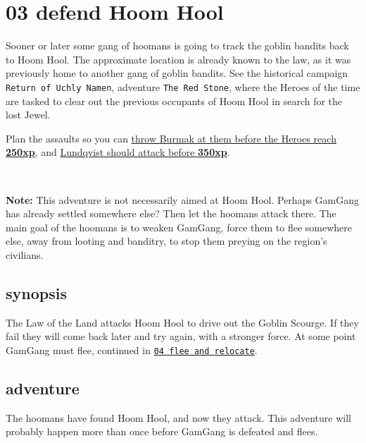 \clearpage
\section*{03 defend Hoom Hool}
\label{03defendhoomhool}

Sooner or later some gang of hoomans is going to track the goblin bandits back to Hoom Hool. The approximate location is already known to the law, as it was previously home to another gang of goblin bandits. See the historical campaign \texttt{Return of Uchly Namen}, adventure \texttt{The Red Stone}, where the Heroes of the time are tasked to clear out the previous occupants of Hoom Hool in search for the lost Jewel.

Plan the assaults so you can 
\hyperref[appendixburmak]{throw Burmak at them before the Heroes reach \textbf{250xp}}, and 
\hyperref[appendixlundqvist]{Lundqvist should attack before \textbf{350xp}}.

\

\noindent\textbf{Note:} This adventure is not necessarily aimed at Hoom Hool. Perhaps GamGang has already settled somewhere else? Then let the hoomans attack there. The main goal of the hoomans is to weaken GamGang, force them to flee somewhere else, away from looting and banditry, to stop them preying on the region's civilians.


\subsection*{synopsis}

The Law of the Land attacks Hoom Hool to drive out the Goblin Scourge. If they fail they will come back later and try again, with a stronger force. At some point GamGang must flee, continued in \hyperref[04fleeandrelocate]{\texttt{04 flee and relocate}}.


\subsection*{adventure}

The hoomans have found Hoom Hool, and now they attack. This adventure will probably happen more than once before GamGang is defeated and flees.

